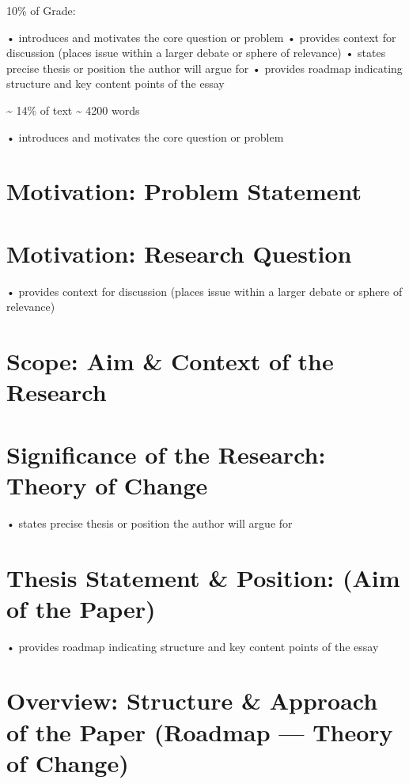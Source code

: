 \documentclass[12pt,a4paper]{report}      %
\begin{document}
10\% of Grade:

• introduces and motivates the core question or problem • provides
context for discussion (places issue within a larger debate or sphere of
relevance) • states precise thesis or position the author will argue for
• provides roadmap indicating structure and key content points of the
essay

\textasciitilde{} 14\% of text \textasciitilde{} 4200 words

• introduces and motivates the core question or problem

\section{Motivation: Problem
Statement}\label{motivation-problem-statement}

\section{Motivation: Research
Question}\label{motivation-research-question}

• provides context for discussion (places issue within a larger debate
or sphere of relevance)

\section{Scope: Aim \& Context of the
Research}\label{scope-aim-context-of-the-research}

\section{Significance of the Research: Theory of
Change}\label{significance-of-the-research-theory-of-change}

• states precise thesis or position the author will argue for

\section{Thesis Statement \& Position: (Aim of the
Paper)}\label{thesis-statement-position-aim-of-the-paper}

• provides roadmap indicating structure and key content points of the
essay

\section{Overview: Structure \& Approach of the Paper (Roadmap ---
Theory of
Change)}\label{overview-structure-approach-of-the-paper-roadmap-theory-of-change}
\end{document}
